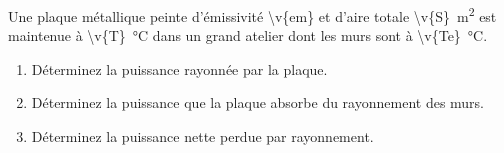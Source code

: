Une plaque métallique peinte d'émissivité \num{\v{em}} et d'aire totale \qty{\v{S}}{m^2} est maintenue à \qty{\v{T}}{\degreeCelsius} dans un grand atelier dont les murs sont à \qty{\v{Te}}{\degreeCelsius}.

\begin{enumerate}[label=\alph*)]
    \item Déterminez la puissance rayonnée par la plaque.
    \item Déterminez la puissance que la plaque absorbe du rayonnement des murs.
    \item Déterminez la puissance nette perdue par rayonnement.
\end{enumerate}
